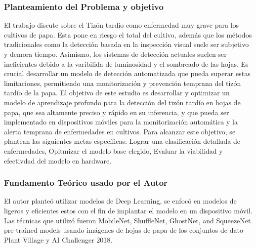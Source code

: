 \subsubsection{Planteamiento del Problema y objetivo }
El trabajo discute sobre el Tizón tardío como enfermedad muy grave para los cultivos de papa. Esta pone en riesgo el total del cultivo, además que los métodos tradicionales como la detección basada en la inspección visual suele ser subjetivo y demora tiempo. Asimismo, los sistemas de detección actuales suelen ser ineficientes debido a la varibilida de luminosidad y el sombreado de las hojas. Es crucial desarrollar un modelo de detección automatizada que pueda superar estas limitaciones, permitiendo una monitorización y prevención temprana del tizón tardío de la papa. El objetivo de este estudio es desarrollar y optimizar un modelo de aprendizaje profundo para la detección del tizón tardío en hojas de papa, que sea altamente preciso y rápido en su inferencia, y que pueda ser implementado en dispositivos móviles para la monitorización automática y la alerta temprana de enfermedades en cultivos. Para alcanzar este objetivo, se plantean las siguientes metas específicas: Lograr una clasificación detallada de enfermedades, Opitmizar el modelo base elegido, Evaluar la viabilidad y efectivdad del modelo en hardware.

\subsubsection{Fundamento Teórico usado por el Autor}

El autor planteó utilizar modelos de Deep Learning, se enfocó en modelos de ligeros y eficientes estos con el fin de implantar el modelo en un dispositivo móvil. Las técnicas que utilizó fueron MobileNet, ShuffleNet, GhostNet, and SqueezeNet pre-trained models usando imágenes de hojas de papa de los conjuntos de dato Plant Village y AI Challenger 2018. 

